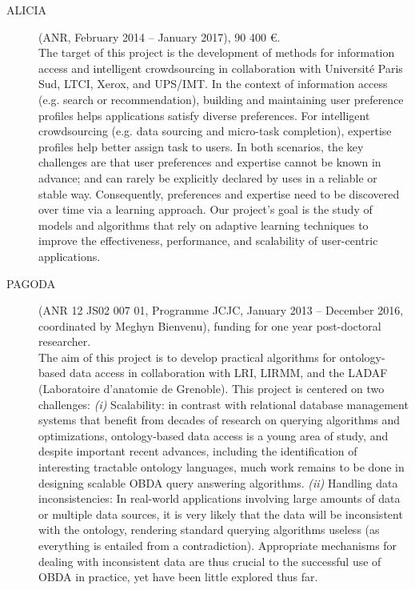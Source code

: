\begin{description}
\item[ALICIA] (ANR, February 2014 -- January 2017), 90 400 \euro. \\
The target of this project is the development of methods for information access and intelligent crowdsourcing in collaboration with Universit{\'e} Paris Sud, LTCI, Xerox, and UPS/IMT. In the context of information access (e.g. search or recommendation), building and maintaining user preference profiles helps applications satisfy diverse preferences. For intelligent crowdsourcing (e.g. data sourcing and micro-task completion), expertise profiles help better assign task to users. In both scenarios, the key challenges are that user preferences and expertise cannot be known in advance; and can rarely be explicitly declared by uses in a reliable or stable way. Consequently, preferences and expertise need to be discovered over time via a learning approach. Our project’s goal is the study of models and algorithms that rely on adaptive learning techniques to improve the effectiveness, performance, and scalability of user-centric applications.

\item[PAGODA] (ANR 12 JS02 007 01, Programme JCJC, January 2013 -- December 2016, coordinated by Meghyn Bienvenu), funding for one year post-doctoral researcher. \\
The aim of this project is to develop practical algorithms for ontology-based data access in collaboration with LRI, LIRMM, and the LADAF (Laboratoire d'anatomie de Grenoble). This project is centered on two challenges:
\textit{(i)} Scalability: in contrast with relational database management systems that benefit from decades of research on querying algorithms and optimizations, ontology-based data access is a young area of study, and despite important recent advances, including the identification of interesting tractable ontology languages, much work remains to be done in designing scalable OBDA query answering algorithms.
\textit{(ii)} Handling data inconsistencies: In real-world applications involving large amounts of data or multiple data sources, it is very likely that the data will be inconsistent with the ontology, rendering standard querying algorithms useless (as everything is entailed from a contradiction). Appropriate mechanisms for dealing with inconsistent data are thus crucial to the successful use of OBDA in practice, yet have been little explored thus far.


\end{description}
